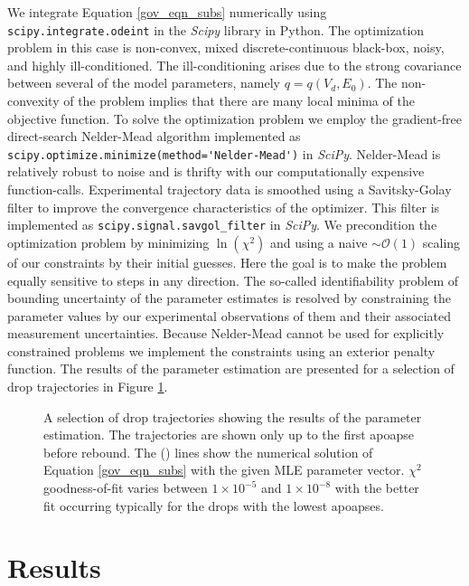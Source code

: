 \documentclass[aip,reprint, floatfix]{revtex4-1}
\begin{document}
We integrate Equation \ref{gov_eqn_subs} numerically using \verb|scipy.integrate.odeint| in the \emph{Scipy} \cite{oliphant_python_2007} library in Python. The optimization problem in this case is non-convex, mixed discrete-continuous black-box, noisy, and highly ill-conditioned. The ill-conditioning arises due to the strong covariance between several of the model parameters, namely $q=q(V_d, E_0)$. The non-convexity of the problem implies that there are many local minima of the objective function. To solve the optimization problem we employ the gradient-free direct-search Nelder-Mead \cite{nelder_simplex_1965} algorithm implemented as \verb|scipy.optimize.minimize(method='Nelder-Mead')| in \emph{SciPy}. Nelder-Mead is relatively robust to noise and is thrifty with our computationally expensive function-calls. Experimental trajectory data is smoothed using a Savitsky-Golay filter \cite{savitzky_smoothing_1964} to improve the convergence characteristics of the optimizer. This filter is implemented as \verb|scipy.signal.savgol_filter| in \emph{SciPy}. We precondition the optimization problem by minimizing $\ln(\chi^2)$ and using a naive $\sim \mathcal{O}(1)$ scaling of our constraints by their initial guesses. Here the goal is to make the problem equally sensitive to steps in any direction. The so-called identifiability problem of bounding uncertainty of the parameter estimates is resolved by constraining the parameter values by our experimental observations of them and their associated measurement uncertainties. Because Nelder-Mead cannot be used for explicitly constrained problems we implement the constraints using an exterior penalty function. The results of the parameter estimation are presented for a selection of drop trajectories in Figure \ref{fig:inverse_problem}.

\begin{figure}[h]
    \centering
    \resizebox{0.5\textwidth}{!}{}
    \caption{A selection of drop trajectories showing the results of the parameter estimation. The trajectories are shown only up to the first apoapse before rebound. The (\protect\redline) lines show the numerical solution of Equation \ref{gov_eqn_subs} with the given MLE parameter vector. $\chi^2$ goodness-of-fit varies between $1 \times 10^{-5}$ and $1 \times 10^{-8}$ with the better fit occurring typically for the drops with the lowest apoapses.}
    \label{fig:inverse_problem}
\end{figure}

\section{Results}
\end{document}

